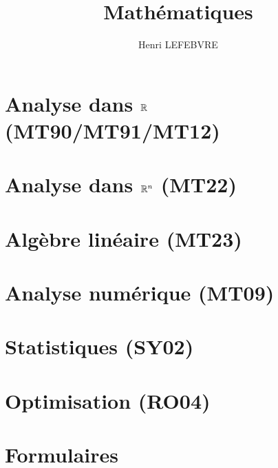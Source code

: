 \documentclass[10pt]{report}
\title{Mathématiques}
\author{Henri LEFEBVRE}
\begin{document}
    \maketitle
    \tableofcontents
    
    \chapter{Analyse dans $\mathbb{R}$ \small{(MT90/MT91/MT12)}}
    

    \chapter{Analyse dans $\mathbb{R}^n$ \small{(MT22)}}
    

    \chapter{Algèbre linéaire \small{(MT23)}}
    

    \chapter{Analyse numérique \small{(MT09)}}
    

    \chapter{Statistiques \small{(SY02)}}
    

    \chapter{Optimisation \small{(RO04)}}
    

    \chapter{Formulaires}
    
\end{document}

